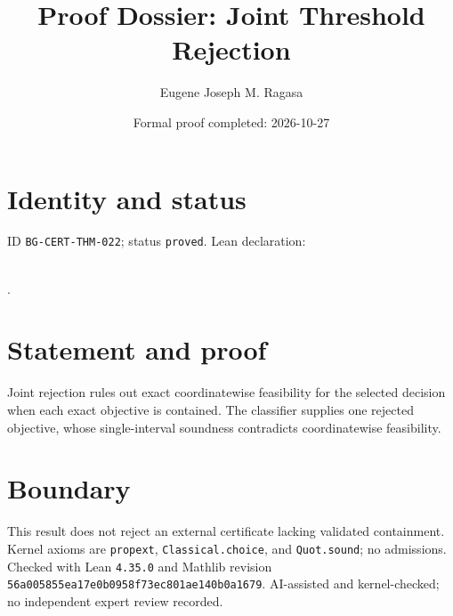 \documentclass[11pt]{article}
\title{Proof Dossier: Joint Threshold Rejection}\author{Eugene Joseph M. Ragasa}\date{Formal proof completed: 2026-10-27}
\begin{document}
\maketitle
\section{Identity and status}
ID \texttt{BG-CERT-THM-022}; status \texttt{proved}. Lean declaration:
\par{}\\
{\tiny{}}.
\section{Statement and proof}
Joint rejection rules out exact coordinatewise feasibility for the selected decision when
each exact objective is contained. The classifier supplies one rejected objective, whose
single-interval soundness contradicts coordinatewise feasibility.
\section{Boundary}
This result does not reject an external certificate lacking validated containment.
Kernel axioms are \texttt{propext}, \texttt{Classical.choice}, and \texttt{Quot.sound};
no admissions. Checked with Lean \texttt{4.35.0} and Mathlib revision
\texttt{56a005855ea17e0b0958f73ec801ae140b0a1679}. AI-assisted and kernel-checked;
no independent expert review recorded.
\end{document}
